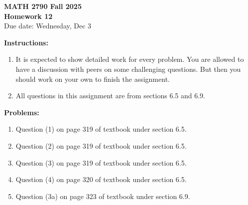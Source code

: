 \documentclass[12pt]{article}
\begin{document}
\begin{center}
\textbf{\Large MATH 2790 Fall 2025}\\[1em]
\textbf{\Large Homework 12}\\[0.5em]
Due date: Wednesday, Dec 3
\end{center}

\bigskip

\textbf{Instructions:}

\begin{enumerate}[label=(\alph*)]
\item It is expected to show detailed work for every problem. You are allowed to have a
discussion with peers on some challenging questions. But then you should work on
your own to finish the assignment.

\item All questions in this assignment are from sections 6.5 and 6.9.
\end{enumerate}

\bigskip

\textbf{Problems:}

\begin{enumerate}
\item Question (1) on page 319 of textbook under section 6.5.

\item Question (2) on page 319 of textbook under section 6.5.

\item Question (3) on page 319 of textbook under section 6.5.

\item Question (4) on page 320 of textbook under section 6.5.

\item Question (3a) on page 323 of textbook under section 6.9.
\end{enumerate}
\end{document}
